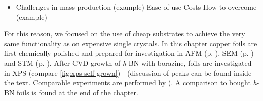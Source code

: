 \begin{itemize}	
	\item Challenges in mass production (example)
  	  \subitem Ease of use
 	  \subitem Costs
	    \subsubitem How to overcome (example)
\end{itemize}	

For this reason, we focused on the use of cheap substrates to achieve the very same functionality as on expensive single crystals. In this chapter copper foils are first chemically polished and prepared for investigation in AFM (p. \pageref{sec:foil-AFM}), SEM (p. \pageref{sec:foil-SEM}) and STM (p. \pageref{sec:foil-STM}). After CVD growth of \textit{h}-BN with borazine, foils are investigated in XPS (compare \autoref{fig:xps-self-grown}) - (discussion of peaks can be found inside the text. Comparable experiments  are performed by \cite[8]{stables_report_2008}). A comparison to bought \textit{h}-BN foils is found at the end of the chapter.
